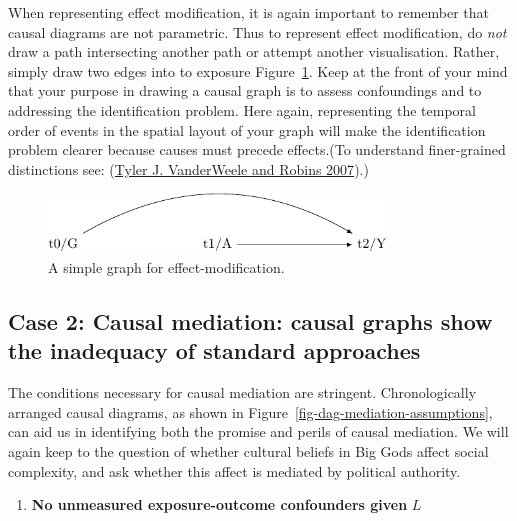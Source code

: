 \documentclass[
  singlecolumn]{report}
\providecommand{\tightlist}{%
  \setlength{\itemsep}{0pt}\setlength{\parskip}{0pt}}\usepackage{longtable,booktabs,array}
\begin{document}
When representing effect modification, it is again important to remember
that causal diagrams are not parametric. Thus to represent effect
modification, do \emph{not} draw a path intersecting another path or
attempt another visualisation. Rather, simply draw two edges into to
exposure Figure~\ref{fig-dag-effect-modfication}. Keep at the front of
your mind that your purpose in drawing a causal graph is to assess
confoundings and to addressing the identification problem. Here again,
representing the temporal order of events in the spatial layout of your
graph will make the identification problem clearer because causes must
precede effects.(To understand finer-grained distinctions see:
(\protect\hyperlink{ref-vanderweele2007}{Tyler J. VanderWeele and Robins
2007}).)

\begin{figure}

{\centering \includegraphics[width=0.8\textwidth,height=\textheight]{causal-dags_files/figure-pdf/fig-dag-effect-modfication-1.pdf}

}

\caption{\label{fig-dag-effect-modfication}A simple graph for
effect-modification.}

\end{figure}

\hypertarget{case-2-causal-mediation-causal-graphs-show-the-inadequacy-of-standard-approaches}{%
\subsection{Case 2: Causal mediation: causal graphs show the inadequacy
of standard
approaches}\label{case-2-causal-mediation-causal-graphs-show-the-inadequacy-of-standard-approaches}}

The conditions necessary for causal mediation are stringent.
Chronologically arranged causal diagrams, as shown in
Figure~\ref{fig-dag-mediation-assumptions}, can aid us in identifying
both the promise and perils of causal mediation. We will again keep to
the question of whether cultural beliefs in Big Gods affect social
complexity, and ask whether this affect is mediated by political
authority.

\begin{enumerate}
\def\labelenumi{\arabic{enumi}.}
\tightlist
\item
  \textbf{No unmeasured exposure-outcome confounders given} \(L\)
\end{enumerate}
\end{document}
